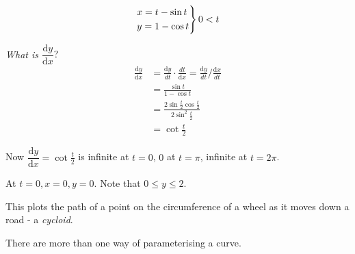 \documentclass[10pt]{scrartcl}
\begin{document}
\begin{example}
\[
\begin{rcases*}
 x = t-\sin t\\
 y = 1-\cos t 
 \end{rcases*}
  0 < t
\]	


\emph{What is $\dfrac{\mathrm{d}y}{\mathrm{d}x}$}? 
\[
\begin{aligned}
  \frac{\mathrm{d}y}{\mathrm{d}x} &= \frac{\mathrm{d}y}{dt} \cdot \frac{dt}{\mathrm{d}x} = \frac{\mathrm{d}y}{dt} / \frac{\mathrm{d}x}{dt}\\[.3cm]
  &= \frac{\sin t}{1-\cos t}\\[.3cm]
  &= \frac{2\sin\frac{t}{2}\cos\frac{t}{2}}{2\sin^2\frac{t}{2}}\\
  &= \cot \frac{t}{2}
\end{aligned}
\]

Now $\dfrac{\mathrm{d}y}{\mathrm{d}x} = \cot\frac{t}{2}$ is infinite at $t = 0$, $0$ at $t = \pi$, infinite at $t = 2\pi$. 

At $t = 0, x = 0, y = 0$. Note that $0 \leq y \leq 2$. 

\begin{center}
\end{center}

This plots the path of a point on the circumference of a wheel as it moves down a road - a \emph{cycloid}. 

\end{example}

There  are more than one way of parameterising a curve.\\
\end{document}
